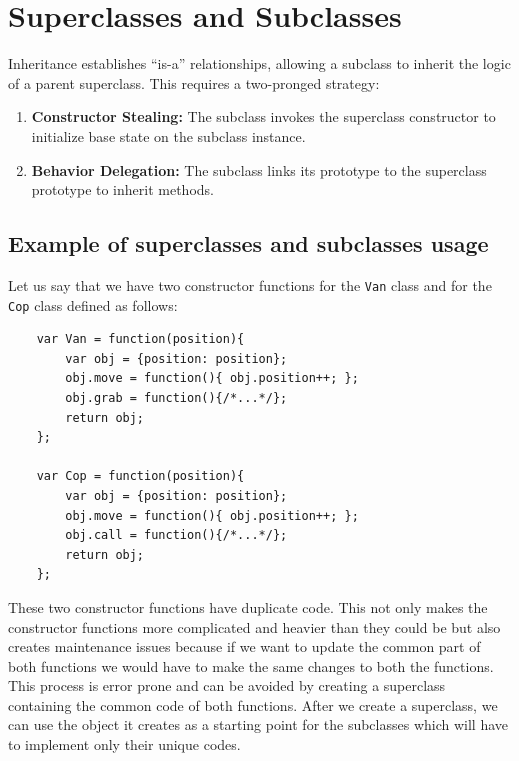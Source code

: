 \documentclass{scrbook}
\begin{document}
\section{Superclasses and Subclasses}

Inheritance establishes ``is-a'' relationships, allowing a subclass to inherit the logic of a parent superclass. This requires a two-pronged strategy:

\begin{enumerate}
    \item \textbf{Constructor Stealing:} The subclass invokes the superclass constructor to initialize base state on the subclass instance.
    \item \textbf{Behavior Delegation:} The subclass links its prototype to the superclass prototype to inherit methods.
\end{enumerate}

\subsection{Example of superclasses and subclasses usage}

Let us say that we have two constructor functions for the \texttt{Van} class and for the \texttt{Cop} class defined as follows:

\begin{lstlisting}
    var Van = function(position){
        var obj = {position: position};
        obj.move = function(){ obj.position++; };
        obj.grab = function(){/*...*/};
        return obj;
    };
    
    var Cop = function(position){
        var obj = {position: position};
        obj.move = function(){ obj.position++; };
        obj.call = function(){/*...*/};
        return obj;
    };
\end{lstlisting}

These two constructor functions have duplicate code. This not only makes the constructor functions more complicated and heavier than they could be but also creates maintenance issues because if we want to update the common part of both functions we would have to make the same changes to both the functions. This process is error prone and can be avoided by creating a superclass containing the common code of both functions. After we create a superclass, we can use the object it creates as a starting point for the subclasses which will have to implement only their unique codes.\\
\end{document}
